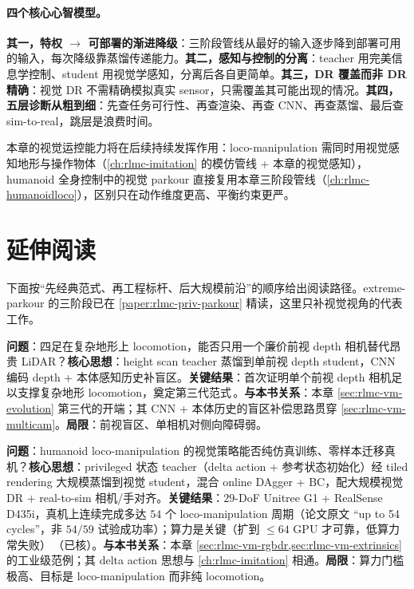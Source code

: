 \paragraph{四个核心心智模型。}\textbf{其一，特权 $\to$ 可部署的渐进降级}：三阶段管线从最好的输入逐步降到部署可用的输入，每次降级靠蒸馏传递能力。\textbf{其二，感知与控制的分离}：teacher 用完美信息学控制、student 用视觉学感知，分离后各自更简单。\textbf{其三，DR 覆盖而非 DR 精确}：视觉 DR 不需精确模拟真实 sensor，只需覆盖其可能出现的情况。\textbf{其四，五层诊断从粗到细}：先查任务可行性、再查渲染、再查 CNN、再查蒸馏、最后查 sim-to-real，跳层是浪费时间。

本章的视觉运控能力将在后续持续发挥作用：loco-manipulation 需同时用视觉感知地形与操作物体（\cref{ch:rlmc-imitation} 的模仿管线 + 本章的视觉感知），humanoid 全身控制中的视觉 parkour 直接复用本章三阶段管线（\cref{ch:rlmc-humanoidloco}），区别只在动作维度更高、平衡约束更严。

\section{延伸阅读}
\label{sec:rlmc-vm-further}

下面按“先经典范式、再工程标杆、后大规模前沿”的顺序给出阅读路径。extreme-parkour 的三阶段已在 \cref{paper:rlmc-priv-parkour} 精读，这里只补视觉视角的代表工作。

\begin{paper}\label{paper:rlmc-vm-agarwal}
\textbf{问题}：四足在复杂地形上 locomotion，能否只用一个廉价前视 depth 相机替代昂贵 LiDAR？\textbf{核心思想}：height scan teacher 蒸馏到单前视 depth student，CNN 编码 depth + 本体感知历史补盲区。\textbf{关键结果}：首次证明单个前视 depth 相机足以支撑复杂地形 locomotion，奠定第三代范式\,\cite{agarwal2023legged}。\textbf{与本书关系}：本章 \cref{sec:rlmc-vm-evolution} 第三代的开端；其 CNN + 本体历史的盲区补偿思路贯穿 \cref{sec:rlmc-vm-multicam}。\textbf{局限}：前视盲区、单相机对侧向障碍弱。
\end{paper}

\begin{paper}\label{paper:rlmc-vm-viral}
\textbf{问题}：humanoid loco-manipulation 的视觉策略能否纯仿真训练、零样本迁移真机？\textbf{核心思想}：privileged 状态 teacher（delta action + 参考状态初始化）经 tiled rendering 大规模蒸馏到视觉 student，混合 online DAgger + BC，配大规模视觉 DR + real-to-sim 相机/手对齐。\textbf{关键结果}：$29$-DoF Unitree G1 + RealSense D435i，真机上连续完成多达 $54$ 个 loco-manipulation 周期（论文原文 “up to 54 cycles”，非 $54/59$ 试验成功率）；算力是关键（扩到 $\le 64$ GPU 才可靠，低算力常失败）\,\cite{he2025viral}（已核）。\textbf{与本书关系}：本章 \cref{sec:rlmc-vm-rgbdr,sec:rlmc-vm-extrinsics} 的工业级范例；其 delta action 思想与 \cref{ch:rlmc-imitation} 相通。\textbf{局限}：算力门槛极高、目标是 loco-manipulation 而非纯 locomotion。
\end{paper}

